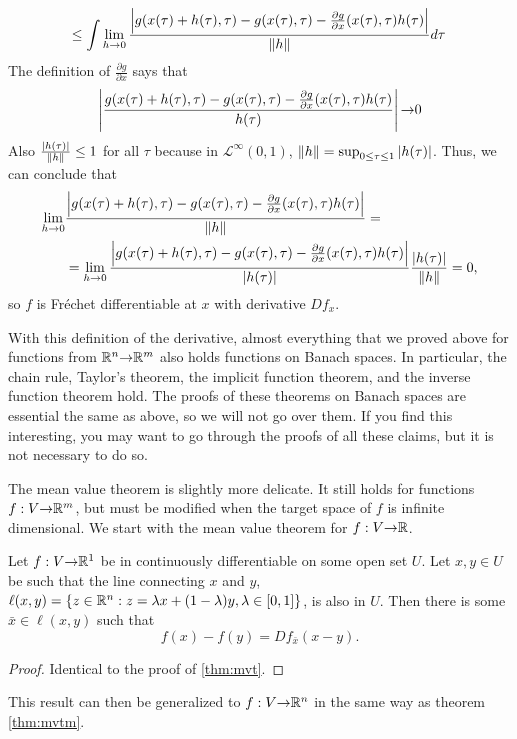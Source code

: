\begin{example*}
\begin{align*}
    \;\; & \leq  \int \lim_{h {\rightarrow} 0} \frac{ \left\vert { g(x(\tau) + h(\tau), \tau) -
        g(x(\tau),\tau) - \frac{\partial g}{\partial x}(x(\tau),\tau)
        h(\tau)} \right\vert } {\left\Vert {h} \right\Vert} d\tau 
  \end{align*}
  The definition of $\frac{\partial g}{\partial x}$ says that
  \[ \left\vert {\frac{ g(x(\tau) + h(\tau), \tau) -
      g(x(\tau),\tau) - \frac{\partial g}{\partial x}(x(\tau),\tau)
      h(\tau)}{h(\tau)}} \right\vert {\rightarrow} 0 \]
  Also $\frac{\left\vert {h(\tau)} \right\vert}{\left\Vert {h} \right\Vert} \leq 1$ for all $\tau$ because
  in $\mathcal{L}^\infty(0,1)$, $\left\Vert {h} \right\Vert = \sup_{0 \leq \tau \leq 1}
  \left\vert {h(\tau)} \right\vert$. Thus, we can conclude that
  \begin{align*}
    \lim_{h {\rightarrow} 0} & \frac{ \left\vert { g(x(\tau) + h(\tau), \tau) -
        g(x(\tau),\tau) - \frac{\partial g}{\partial x}(x(\tau),\tau)
        h(\tau)} \right\vert } {\left\Vert {h} \right\Vert}
    = \\ 
    & = \lim_{h {\rightarrow} 0} \frac{ \left\vert { g(x(\tau) + h(\tau), \tau) -
        g(x(\tau),\tau) - \frac{\partial g}{\partial x}(x(\tau),\tau)
        h(\tau)} \right\vert } {\left\vert {h(\tau)} \right\vert} \frac{\left\vert {h(\tau)} \right\vert} {\left\Vert {h} \right\Vert}  
    = 0,
  \end{align*}
  so $f$ is Fr\'{e}chet differentiable at $x$ with derivative $Df_x$. 
\end{example*}

With this definition of the derivative, almost everything that we
proved above for functions from $\mathbb{R}^n {\rightarrow} \mathbb{R}^m$ also holds functions
on Banach spaces. In particular, the chain rule, Taylor's theorem, the
implicit function theorem, and the inverse function theorem hold. The
proofs of these theorems on Banach spaces are essential the same as
above, so we will not go over them. If you find this interesting, you
may want to go through the proofs of all these claims, but it is not
necessary to do so. 

The mean value theorem is slightly more delicate. It still holds for
functions $f:V {\rightarrow} \mathbb{R}^m$, but must be modified when the target space
of $f$ is infinite dimensional. We start with the mean value theorem
for $f:V {\rightarrow} \mathbb{R}$. 
\begin{theorem}
  Let $f:V {\rightarrow} \mathbb{R}^1$ be in continuously differentiable on some open
  set $U$. Let $x, y \in U$ be such that the line connecting $x$ and
  $y$,
  $\ell(x,y) = \{z\in \mathbb{R}^n: z = \lambda x + (1-\lambda) y, \lambda \in
  [0,1]\}$, is also in $U$. Then there is some $\bar{x} \in \ell(x,y)$
  such that
  \[ f(x) - f(y) = Df_{\bar{x}} (x-y). \]
\end{theorem}
\begin{proof}
  Identical to the proof of \ref{thm:mvt}.
\end{proof}
This result can then be generalized to $f:V {\rightarrow} \mathbb{R}^n$ in the same way
as theorem \ref{thm:mvtm}. 

